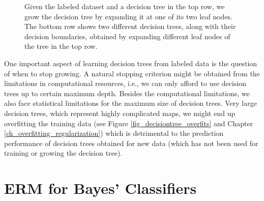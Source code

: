 \documentclass[12pt]{report}
\begin{document}
\begin{figure}[htbp]
\begin{minipage}{0.25\textwidth}
{}
\end{minipage}
\caption{Given the labeled dataset and a decision tree in the top row, 
	we grow the decision tree by expanding it at one of 
	its two leaf nodes. The bottom row shows two different 
	decision trees, along with their decision boundaries, 
	obtained by expanding different leaf nodes of the 
	tree in the top row.}
\label{fig_growingatree}
\end{figure}
 
One important aspect of learning decision trees from labeled 
data is the question of when to stop growing. A natural stopping 
criterion might be obtained from the limitations in computational 
resources, i.e., we can only afford to use decision trees up to 
certain maximum depth. Besides the computational limitations, 
we also face statistical limitations for the maximum size of decision 
trees. Very large decision trees, which represent 
highly complicated maps, we might end up overfitting the training 
data (see Figure \ref{fig_decisiontree_overfits} and Chapter \ref{ch_overfitting_regularization}) 
which is detrimental to the prediction performance of decision 
trees obtained for new data (which has not been used for training 
or growing the decision tree). 
 
 \section{ERM for Bayes' Classifiers} 
 \label{sec_ERM_Bayes} 
 
\end{document}

